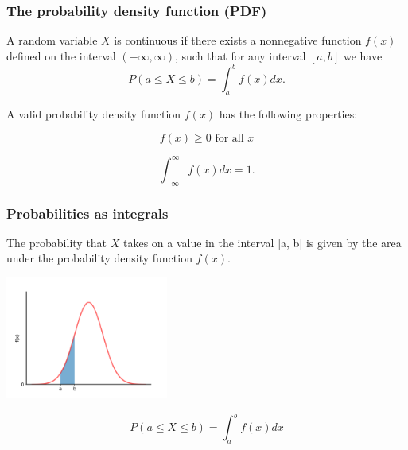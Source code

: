 \documentclass{beamer}
\begin{document}
\begin{frame}
\frametitle{The probability density function (PDF)}

\begin{definition} 
A random variable $X$ is continuous if there exists a nonnegative function $f(x)$ defined on the interval $(-\infty, \infty)$, such that for any interval $[a, b]$ we have 
\begin{equation*}
P(a \leq X \leq b) = \int_a^b f(x) dx.
\end{equation*} 
\end{definition}

\vspace{0.3cm}


A valid probability density function $f(x)$ has the following properties:

\begin{equation}
f(x) \geq 0 \textrm{ for all } x
\end{equation}

\begin{equation}
\int_{-\infty}^\infty f(x) dx = 1.
\end{equation}

\end{frame}

\begin{frame}
\frametitle{Probabilities as integrals}

The probability that $X$ takes on a value in the interval [a, b] is given by the area under the probability density function $f(x)$.

\vspace{-0.25cm}
\begin{center}
\includegraphics[height=4cm]{images/normal_area.png}
\end{center}

\vspace{-0.5cm}

\begin{equation*}
P(a \leq X \leq b) = \int_a^b f(x) dx
\end{equation*}

\end{frame}
\end{document}
